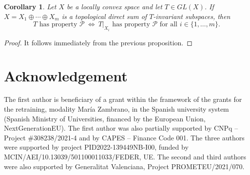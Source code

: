 \documentclass[12pt]{amsart}
\theoremstyle{theorem}
\newtheorem{corollary}[theorem]{Corollary}
\theoremstyle{definition}
\theoremstyle{remark} \theoremstyle{question} \theoremstyle{example}
\newcommand{\cP}{\mathcal{P}}
\begin{document}
\begin{corollary}
Let $X$ be a locally convex space and let $T \in GL(X)$.
If $X = X_1 \oplus \cdots \oplus X_m$ is a topological direct sum of $T$-invariant subspaces, then
\[
T \text{ has property } \cP \ \Longleftrightarrow \ T|_{X_i} \text{ has property } \cP \text{ for all } i \in \{1,\ldots,m\}.
\]
\end{corollary}

\begin{proof}
It follows immediately from the previous proposition.
\end{proof}


\section*{Acknowledgement}

The first author is beneficiary of a grant within the framework of the grants for the retraining, modality Mar\'ia Zambrano, 
in the Spanish university system (Spanish Ministry of Universities, financed by the European Union, NextGenerationEU).
The first author was also partially supported by CNPq -- Project {\#}308238/2021-4 and by CAPES -- Finance Code 001.
The three authors were supported by project PID2022-139449NB-I00, funded by MCIN/AEI/10.13039/501100011033/FEDER, UE.
The second and third authors were also supported by Generalitat Valenciana, Project PROMETEU/2021/070.

\end{document}
